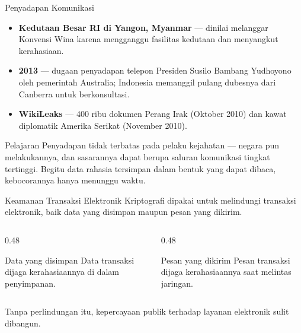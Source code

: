 \documentclass[aspectratio=169,11pt]{beamer}
\begin{document}
\begin{frame}{Penyadapan Komunikasi}
    \begin{itemize}
        \item \textbf{Kedutaan Besar RI di Yangon, Myanmar} --- dinilai melanggar
              Konvensi Wina karena mengganggu fasilitas kedutaan dan menyangkut
              kerahasiaan.
        \item \textbf{2013} --- dugaan penyadapan telepon Presiden Susilo Bambang
              Yudhoyono oleh pemerintah Australia; Indonesia memanggil pulang
              dubesnya dari Canberra untuk berkonsultasi.
        \item \textbf{WikiLeaks} --- 400 ribu dokumen Perang Irak (Oktober 2010) dan
              kawat diplomatik Amerika Serikat (November 2010).
    \end{itemize}
    \vspace{0.3cm}
    \begin{alertblock}{Pelajaran}
        Penyadapan tidak terbatas pada pelaku kejahatan --- negara pun
        melakukannya, dan sasarannya dapat berupa saluran komunikasi tingkat
        tertinggi. Begitu data rahasia tersimpan dalam bentuk yang dapat dibaca,
        kebocorannya hanya menunggu waktu.
    \end{alertblock}
\end{frame}

\begin{frame}{Keamanan Transaksi Elektronik}
    Kriptografi dipakai untuk melindungi transaksi elektronik, baik data yang
    disimpan maupun pesan yang dikirim.
    \vspace{0.25cm}
    \begin{columns}[T,onlytextwidth]
        \begin{column}{0.48\textwidth}
            \begin{block}{Data yang disimpan}
                Data transaksi dijaga kerahasiaannya di dalam penyimpanan.
            \end{block}
        \end{column}
        \begin{column}{0.48\textwidth}
            \begin{block}{Pesan yang dikirim}
                Pesan transaksi dijaga kerahasiaannya saat melintas jaringan.
            \end{block}
        \end{column}
    \end{columns}
    \vspace{0.3cm}
    Tanpa perlindungan itu, kepercayaan publik terhadap layanan elektronik
    sulit dibangun.
\end{frame}
\end{document}

